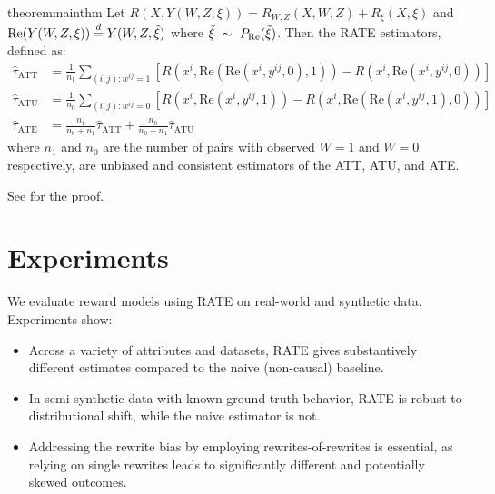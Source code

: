 \documentclass{article}
\begin{document}
\begin{restatable}{theorem}{mainthm}
\label{thm:mainthm}
  Let $R(X, Y(W,Z,\xi)) = R_{W, Z}(X, W, Z) + R_{\xi}(X, \xi)$ and $\text{Re}(Y(W, Z, \xi)) \overset{d}{=} Y(W, Z, \tilde{\xi})$ where $\tilde{\xi} \ \sim\  P_\text{Re}(\tilde{\xi})$.
  Then the RATE estimators, defined as:
  \begin{align*}
  \hat{\tau}_{\text{ATT}} &= \frac{1}{n_1} \sum_{(i, j): w^{ij} = 1} [R(x^i, \text{Re}(\text{Re}(x^i, y^{ij}, 0), 1)) - R(x^i, \text{Re}(x^i, y^{ij}, 0))] \\
  \hat{\tau}_{\text{ATU}} &= \frac{1}{n_0} \sum_{(i,j): w^{ij} = 0} [R(x^i, \text{Re}(x^i, y^{ij}, 1)) - R(x^i, \text{Re}(\text{Re}(x^i, y^{ij}, 1), 0))] \\
  \hat{\tau}_{\text{ATE}} &= \frac{n_1}{n_0 + n_1} \hat{\tau}_{\text{ATT}} + \frac{n_0}{n_0 + n_1} \hat{\tau}_{\text{ATU}}
\end{align*}
where $n_1$ and $n_0$ are the number of pairs with observed $W = 1$ and $W = 0$ respectively, are unbiased and consistent estimators of the ATT, ATU, and ATE.
\end{restatable}

See  for the proof.


\section{Experiments}
\label{sec:experiments}
We evaluate reward models using RATE on real-world and synthetic data. Experiments show:
\begin{itemize}
  \item Across a variety of attributes and datasets, RATE gives substantively different estimates compared to the naive (non-causal) baseline.
  \item In semi-synthetic data with known ground truth behavior, RATE is robust to distributional shift, while the naive estimator is not.
  \item Addressing the rewrite bias by employing rewrites-of-rewrites is essential, as relying on single rewrites leads to significantly different and potentially skewed outcomes.
\end{itemize}
\end{document}
